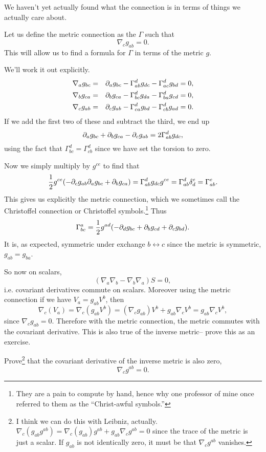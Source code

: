 We haven't yet actually found what the connection is in terms of things we actually care about. 
\begin{defn}
Let us define the metric connection as the $\Gamma$ such that
$$\nabla_c g_{ab}=0.$$
This will allow us to find a formula for $\Gamma$ in terms of the metric $g$.
\end{defn}

We'll work it out explicitly.
\begin{eqnarray*}
\nabla_a g_{bc}&=&\partial_a g_{bc}-\Gamma^d_{ab}g_{dc}-\Gamma^d_{ac}g_{bd}=0,\\
\nabla_b g_{ca}&=&\partial_b g_{ca}-\Gamma^d_{bc} g_{da} - \Gamma^d_{ba}g_{cd}=0,\\
\nabla_c g_{ab}&=&\partial_c g_{ab}-\Gamma^d_{ca} g_{bd}-\Gamma^d_{cb}g_{ad}=0.
\end{eqnarray*}
If we add the first two of these and subtract the third, we end up
$$\partial_a g_{bc}+\partial_b g_{ca} - \partial_c g_{ab} = 2\Gamma^d_{ab} g_{dc},$$
using the fact that $\Gamma^d_{bc}=\Gamma^d_{cb}$ since we have set the torsion to zero.

Now we simply multiply by $g^{ce}$ to find that
$$\frac{1}{2}g^{ce}(-\partial_c g_{ab} \partial_a g_{bc} +\partial_b g_{ca})=\Gamma^d_{ab} g_{dc} g^{ce} =\Gamma^d_{ab} \delta^e_d = \Gamma^e_{ab}.$$
This gives us explicitly the metric connection, which we sometimes call the Christoffel connection or Christoffel symbols.\footnote{They are a pain to compute by hand, hence why one professor of mine once referred to them as the ``Christ-awful symbols.''} Thus
$$\Gamma^a_{bc}=\frac{1}{2} g^{ad}(-\partial_d g_{bc}+\partial_b g_{cd} + \partial_c g_{bd}).$$
It is, as expected, symmetric under exchange $b\leftrightarrow c$ since the metric is symmetric, $g_{ab}=g_{ba}$.

So now on scalars,
$$(\nabla_a \nabla_b -\nabla_b \nabla_a)S=0,$$
i.e. covariant derivatives commute on scalars. Moreover using the metric connection if we have $V_a =g_{ab} V^b$, then
$$\nabla_c(V_a)=\nabla_c (g_{ab} V^b)=(\nabla_c g_{ab}) V^b+ g_{ab}\nabla_c V^b= g_{ab}\nabla_c V^b,$$
since $\nabla_c g_{ab}=0$. Therefore with the metric connection, the metric commutes with the covariant derivative. This is also true of the inverse metric-- prove this as an exercise.

\begin{ex}
Prove\footnote{I think we can do this with Leibniz, actually. $\nabla_c(g_{ab}g^{ab})=\nabla_c(g_{ab}) g^{ab}+g_{ab} \nabla_c g^{ab} = 0$ since the trace of the metric is just a scalar. If $g_{ab}$ is not identically zero, it must be that $\nabla_c g^{ab}$ vanishes.} that the covariant derivative of the inverse metric is also zero,
$$\nabla_c g^{ab}=0.$$
\end{ex}